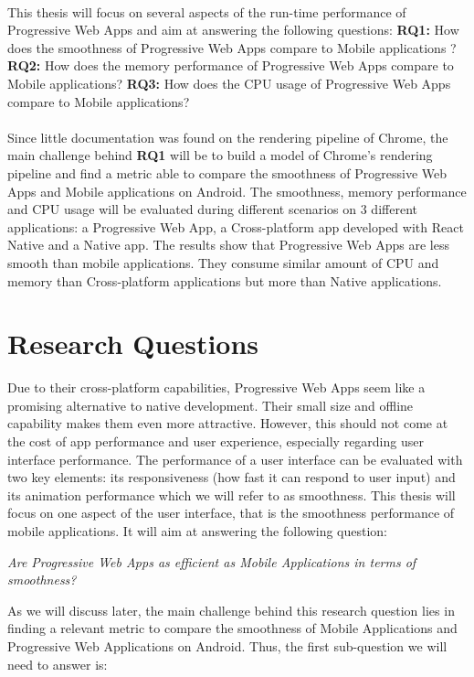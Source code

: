 \documentclass{kththesis}
\begin{document}
\paragraph{}
This thesis will focus on several aspects of the run-time performance of Progressive Web Apps and aim at answering the following questions: \newline
\medskip
\textbf{RQ1:} How does the smoothness of Progressive Web Apps compare to Mobile applications ? \newline
\medskip
\textbf{RQ2:} How does the memory performance of Progressive Web Apps compare to Mobile applications? \newline
\medskip
\textbf{RQ3:} How does the CPU usage of Progressive Web Apps compare to Mobile applications?
\paragraph{}
Since little documentation was found on the rendering pipeline of Chrome, the main challenge behind \textbf{RQ1} will be to build a model of Chrome's rendering pipeline and find a metric able to compare the smoothness of Progressive Web Apps and Mobile applications on Android. The smoothness, memory performance and CPU usage will be evaluated during different scenarios on 3 different applications: a Progressive Web App, a Cross-platform app developed with React Native and a Native app. The results show that Progressive Web Apps are less smooth than mobile applications. They consume similar amount of CPU and memory than Cross-platform applications but more than Native applications.

\iffalse
\section{Research Questions}

Due to their cross-platform capabilities, Progressive Web Apps seem like a promising alternative to native development. Their small size and offline capability makes them even more attractive. However, this should not come at the cost of app performance and user experience, especially regarding user interface performance. The performance of a user interface can be evaluated with two key elements: its responsiveness (how fast it can respond to user input) and its animation performance which we will refer to as smoothness. 
This thesis will focus on one aspect of the user interface, that is the smoothness performance of mobile applications. It will aim at answering the following question: 
\begin{center}
    \textit{Are Progressive Web Apps as efficient as Mobile Applications in terms of smoothness?}
\end{center}
As we will discuss later, the main challenge behind this research question lies in finding a relevant metric to compare the smoothness of Mobile Applications and Progressive Web Applications on Android. Thus, the first sub-question we will need to answer is: \newline
\end{document}
